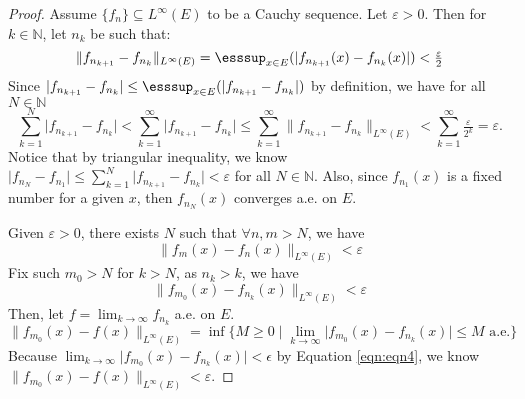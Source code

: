 \begin{answer}
    \begin{proof}
        Assume $\{f_n\} \subseteq L^{\infty}(E)$ to be a Cauchy sequence. Let $\varepsilon > 0$. Then for $k \in \mathbb{N}$, let $n_k$ be such that:
        \begin{equation}
            \lVert f_{n_{k+1}} - f_{n_k} \rVert_{L^{\infty}(E)} = \esssup_{x\in E} (\lvert f_{n_{k+1}}(x) - f_{n_k}(x) \rvert) < \tfrac{\varepsilon}{2}
        \end{equation}
        Since $\lvert f_{n_{k+1}} - f_{n_k} \rvert \leq \esssup_{x\in E} (\lvert f_{n_{k+1}} - f_{n_k} \rvert)$ by definition, we have for all $N \in \mathbb{N}$
        \begin{equation}
            \sum_{k=1}^{N} \lvert f_{n_{k+1}} - f_{n_k} \rvert < \sum_{k=1}^{\infty} \lvert f_{n_{k+1}} - f_{n_k} \rvert \leq \sum_{k=1}^{\infty} \lVert f_{n_{k+1}} - f_{n_k} \rVert_{L^{\infty}(E)} < \sum_{k = 1}^{\infty} \tfrac{\varepsilon}{2^k} = \varepsilon.
        \end{equation}
        Notice that by triangular inequality, we know $\lvert f_{n_N} - f_{n_1} \rvert \leq \sum_{k=1}^{N} \lvert f_{n_{k+1}} - f_{n_k} \rvert < \varepsilon$ for all $N \in \mathbb{N}$. Also, since $f_{n_1}(x)$ is a fixed number for a given $x$, then $f_{n_N}(x)$ converges a.e. on $E$.
        
        Given $\varepsilon > 0$, there exists $N$ such that $\forall n,m > N$, we have 
        \begin{equation}
            \lVert f_m(x) - f_n(x) \rVert_{L^{\infty}(E)} < \varepsilon
        \end{equation}
        Fix such $m_0 > N$ for $k > N$, as $n_k > k$, we have
        \begin{equation}\label{eqn:eqn4}
            \lVert f_{m_0}(x) - f_{n_k}(x) \rVert_{L^{\infty}(E)} < \varepsilon
        \end{equation}
        Then, let $f = \lim_{k \to \infty} f_{n_k}$ a.e. on $E$.
        \begin{equation}
            \lVert f_{m_0}(x) - f(x) \rVert_{L^{\infty}(E)} = \inf\{M \geq 0 \mid \lim_{k \to \infty}\lvert f_{m_0}(x) - f_{n_k}(x) \rvert \leq M \text{ a.e.}\}
        \end{equation}
        Because $\lim_{k \to \infty} \lvert f_{m_0}(x) - f_{n_k}(x)\rvert < \epsilon$ by Equation \ref{eqn:eqn4},  we know $\lVert f_{m_0}(x) - f(x) \rVert_{L^{\infty}(E)} < \varepsilon$.
        

\end{proof}
\end{answer}
